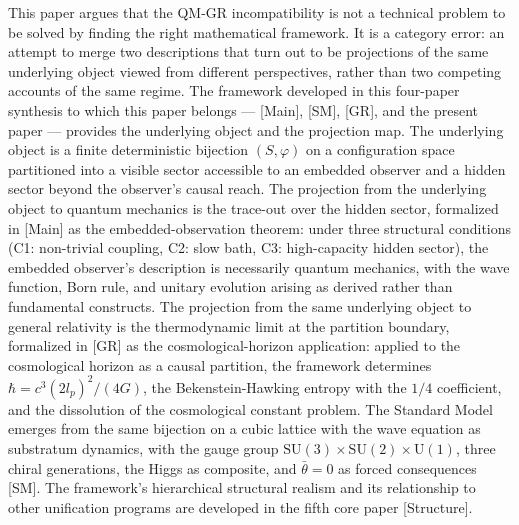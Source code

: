 \documentclass[
]{article}
\begin{document}
This paper argues that the QM-GR incompatibility is not a technical
problem to be solved by finding the right mathematical framework. It is
a category error: an attempt to merge two descriptions that turn out to
be projections of the same underlying object viewed from different
perspectives, rather than two competing accounts of the same regime. The
framework developed in this four-paper synthesis to which this paper
belongs --- {[}Main{]}, {[}SM{]}, {[}GR{]}, and the present paper ---
provides the underlying object and the projection map. The underlying
object is a finite deterministic bijection \((S, \varphi)\) on a
configuration space partitioned into a visible sector accessible to an
embedded observer and a hidden sector beyond the observer's causal
reach. The projection from the underlying object to quantum mechanics is
the trace-out over the hidden sector, formalized in {[}Main{]} as the
embedded-observation theorem: under three structural conditions (C1:
non-trivial coupling, C2: slow bath, C3: high-capacity hidden sector),
the embedded observer's description is necessarily quantum mechanics,
with the wave function, Born rule, and unitary evolution arising as
derived rather than fundamental constructs. The projection from the same
underlying object to general relativity is the thermodynamic limit at
the partition boundary, formalized in {[}GR{]} as the
cosmological-horizon application: applied to the cosmological horizon as
a causal partition, the framework determines
\(\hbar = c^3 (2 l_p)^2 / (4G)\), the Bekenstein-Hawking entropy with
the \(1/4\) coefficient, and the dissolution of the cosmological
constant problem. The Standard Model emerges from the same bijection on
a cubic lattice with the wave equation as substratum dynamics, with the
gauge group
\(\mathrm{SU}(3) \times \mathrm{SU}(2) \times \mathrm{U}(1)\), three
chiral generations, the Higgs as composite, and \(\bar\theta = 0\) as
forced consequences {[}SM{]}. The framework's hierarchical structural
realism and its relationship to other unification programs are developed
in the fifth core paper {[}Structure{]}.
\end{document}

